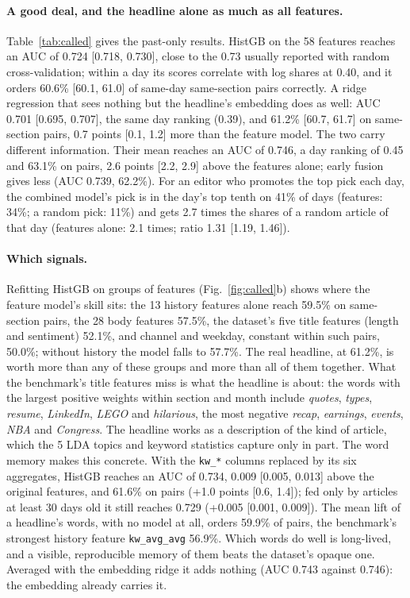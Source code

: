 \documentclass[10pt,a4paper,twocolumn]{article}
\begin{document}
\paragraph{A good deal, and the headline alone as much as all features.} Table~\ref{tab:called} gives the
past-only results. HistGB on the 58 features reaches an AUC of 0.724 [0.718, 0.730], close to the 0.73 usually
reported with random cross-validation; within a day its scores correlate with log shares at 0.40, and it orders
60.6\% [60.1, 61.0] of same-day same-section pairs correctly. A ridge regression that sees nothing but the
headline's embedding does as well: AUC 0.701 [0.695, 0.707], the same day ranking (0.39), and 61.2\% [60.7, 61.7]
on same-section pairs, 0.7 points [0.1, 1.2] more than the feature model. The two carry different information.
Their mean reaches an AUC of 0.746, a day ranking of 0.45 and 63.1\% on pairs, 2.6 points [2.2, 2.9] above the
features alone; early fusion gives less (AUC 0.739, 62.2\%). For an editor who promotes the top pick each day, the
combined model's pick is in the day's top tenth on 41\% of days (features: 34\%; a random pick: 11\%) and gets 2.7 times the shares of a random article of that day (features
alone: 2.1 times; ratio 1.31 [1.19, 1.46]).

\paragraph{Which signals.} Refitting HistGB on groups of features (Fig.~\ref{fig:called}b) shows where the
feature model's skill sits: the 13 history features alone reach 59.5\% on same-section pairs, the 28 body features
57.5\%, the dataset's five title features (length and sentiment) 52.1\%, and channel and weekday, constant within
such pairs, 50.0\%; without history the model falls to 57.7\%. The real headline, at 61.2\%, is worth more than
any of these groups and more than all of them together. What the benchmark's title features miss is what the
headline is about: the words with the largest positive weights within section and month include \emph{quotes},
\emph{types}, \emph{resume}, \emph{LinkedIn}, \emph{LEGO} and \emph{hilarious}, the most negative \emph{recap},
\emph{earnings}, \emph{events}, \emph{NBA} and \emph{Congress}. The headline works as a description of the kind
of article, which the 5 LDA topics and keyword statistics capture only in part. The word memory makes this
concrete. With the \texttt{kw\_*} columns replaced by its six aggregates, HistGB reaches an AUC of 0.734, 0.009
[0.005, 0.013] above the original features, and 61.6\% on pairs (+1.0 points [0.6, 1.4]); fed only by articles at
least 30 days old it still reaches 0.729 (+0.005 [0.001, 0.009]). The mean lift of a headline's words, with no
model at all, orders 59.9\% of pairs, the benchmark's strongest history feature \texttt{kw\_avg\_avg} 56.9\%.
Which words do well is long-lived, and a visible, reproducible memory of them beats the dataset's opaque one.
Averaged with the embedding ridge it adds nothing (AUC 0.743 against 0.746): the embedding already carries it. 
\end{document}
